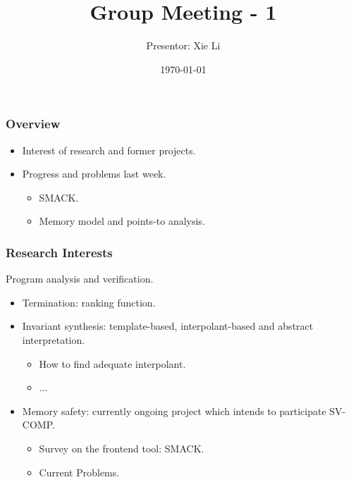 \documentclass[11pt]{beamer}
\title{Group Meeting - 1}
\date{\today}
\author{Presentor: Xie Li}
\begin{document}
\maketitle

\begin{frame}\frametitle{Overview}
\begin{itemize}
\item Interest of research and former projects.

\item Progress and problems last week.
\begin{itemize}
\item SMACK.
\item Memory model and points-to analysis.
\end{itemize}

\end{itemize}
\end{frame}

\begin{frame}\frametitle{Research Interests}

Program analysis and verification.
\begin{itemize}
\item Termination: ranking function.
\item Invariant synthesis: template-based, interpolant-based and abstract interpretation.
\begin{itemize}
\item How to find adequate interpolant.
\item ...
\end{itemize}
\item Memory safety: currently ongoing project which intends to participate SV-COMP.
\begin{itemize}
\item Survey on the frontend tool: SMACK.
\item Current Problems.
\end{itemize}
\end{itemize}
\end{frame}
\end{document}
